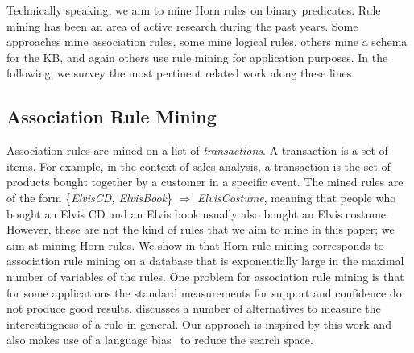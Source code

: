 Technically speaking, we aim to mine Horn rules on binary predicates. 
Rule mining has been an area of active research during the past years. 
Some approaches mine association rules, some mine logical rules, others mine a schema for the KB, and again others use rule mining for application purposes.
In the following, we survey the most pertinent related work along these lines.
\subsection{Association Rule Mining} 
Association rules \cite{AgrImiSwa93} are mined on a list of \emph{transactions}. A transaction is a set of items. 
For example, in the context of sales analysis, a transaction is the set of products bought together by a customer in a specific event. 
The mined rules are of the form \{\emph{ElvisCD, ElvisBook}\} $\Rightarrow$ \emph{ElvisCostume}, meaning that people who bought an Elvis CD and an Elvis book usually also bought an Elvis costume. 
However, these are not the kind of rules that we aim to mine in this paper; we aim at mining Horn rules. We show in \cite{amie} that Horn rule mining corresponds to association rule mining on a database that is exponentially large in the maximal number of variables of the rules.
One problem for association rule mining is that for some applications the standard measurements for support and confidence do not produce good results. 
\cite{TanKumSri02} discusses a number of alternatives to measure the interestingness of a rule in general. 
Our approach is inspired by this work and also makes use of a language bias~\cite{AdeRaeBru95} to reduce the search space. %

